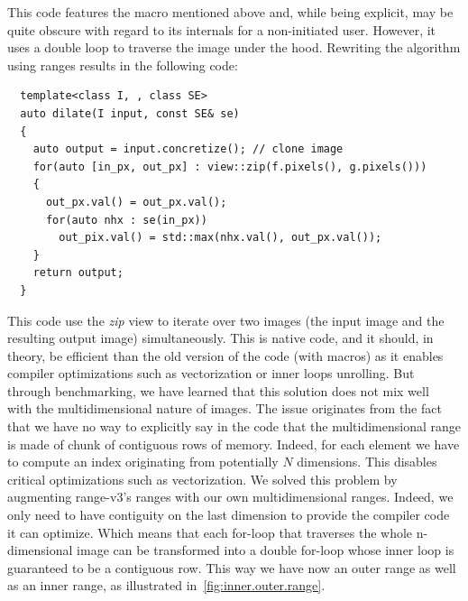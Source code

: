 This code features the macro mentioned above and, while being explicit, may be quite obscure with regard to its
internals for a non-initiated user. However, it uses a double loop to traverse the image under the hood. Rewriting the
algorithm using ranges results in the following code:
\begin{verbatim}
  template<class I, , class SE>
  auto dilate(I input, const SE& se)
  {
    auto output = input.concretize(); // clone image
    for(auto [in_px, out_px] : view::zip(f.pixels(), g.pixels()))
    {
      out_px.val() = out_px.val();
      for(auto nhx : se(in_px))
        out_pix.val() = std::max(nhx.val(), out_px.val());
    }
    return output;
  }
\end{verbatim}
This code use the \emph{zip} view to iterate over two images (the input image and the resulting output image)
simultaneously. This is native code, and it should, in theory, be efficient than the old version of the code (with
macros) as it enables compiler optimizations such as vectorization or inner loops unrolling. But through benchmarking,
we have learned that this solution does not mix well~\parencite{austern.2000.segmented} with the multidimensional nature
of images. The issue originates from the fact that we have no way to explicitly say in the code that the
multidimensional range is made of chunk of contiguous rows of memory. Indeed, for each element we have to compute an
index originating from potentially \(N\) dimensions. This disables critical optimizations such as vectorization. We
solved this problem by augmenting range-v3's ranges with our own multidimensional ranges. Indeed, we only need to have
contiguity on the last dimension to provide the compiler code it can optimize. Which means that each for-loop that
traverses the whole n-dimensional image can be transformed into a double for-loop whose inner loop is guaranteed to be a
contiguous row. This way we have now an outer range as well as an inner range, as illustrated
in~\cref{fig:inner.outer.range}.


